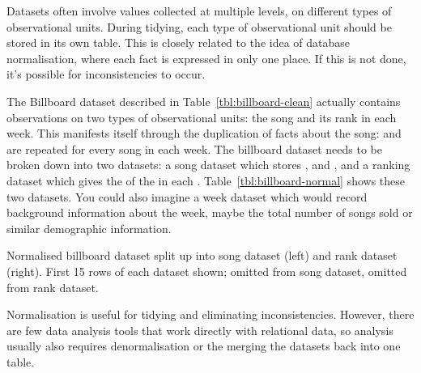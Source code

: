 \documentclass[article]{jss}
\begin{document}
Datasets often involve values collected at multiple levels, on different types of observational units. During tidying, each type of observational unit should be stored in its own table. This is closely related to the idea of database normalisation, where each fact is expressed in only one place. If this is not done, it's possible for inconsistencies to occur. 


The Billboard dataset described in Table~\ref{tbl:billboard-clean} actually contains observations on two types of observational units: the song and its rank in each week. This manifests itself through the duplication of facts about the song:  and  are repeated for every song in each week. The billboard dataset needs to be broken down into two datasets: a song dataset which stores ,  and , and a ranking dataset which gives the  of the  in each . Table~\ref{tbl:billboard-normal} shows these two datasets. You could also imagine a week dataset which would record background information about the week, maybe the total number of songs sold or similar demographic information.

\begin{table}
  \centering
  \hspace{1em}%
  

  \caption{Normalised billboard dataset split up into song dataset (left) and rank dataset (right). First 15 rows of each dataset shown;  omitted from song dataset,  omitted from rank dataset.}
  \label{tbl:billboard-normal}
\end{table}

Normalisation is useful for tidying and eliminating inconsistencies. However, there are few data analysis tools that work directly with relational data, so analysis usually also requires denormalisation or the merging the datasets back into one table. 

\end{document}

